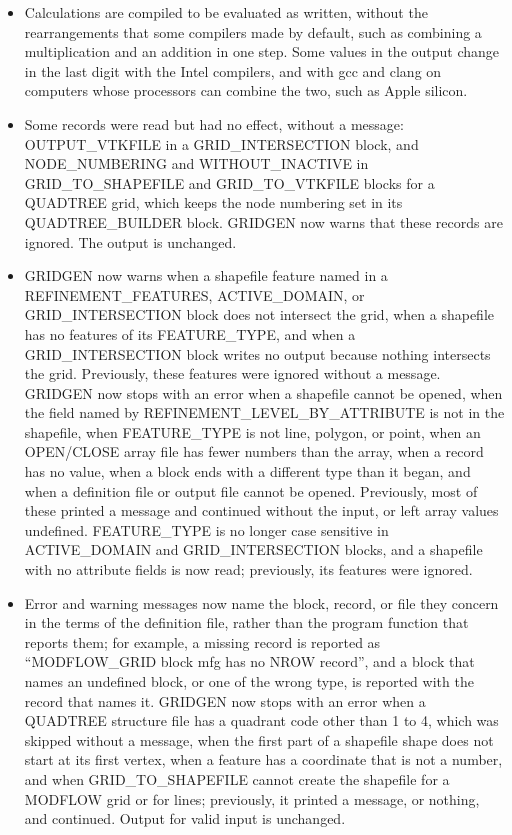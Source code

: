 \begin{itemize}[label=--]
  \item Calculations are compiled to be evaluated as written, without the rearrangements that some compilers made by default, such as combining a multiplication and an addition in one step. Some values in the output change in the last digit with the Intel compilers, and with gcc and clang on computers whose processors can combine the two, such as Apple silicon.
  \item Some records were read but had no effect, without a message: OUTPUT\_VTKFILE in a GRID\_INTERSECTION block, and NODE\_NUMBERING and WITHOUT\_INACTIVE in GRID\_TO\_SHAPEFILE and GRID\_TO\_VTKFILE blocks for a QUADTREE grid, which keeps the node numbering set in its QUADTREE\_BUILDER block. GRIDGEN now warns that these records are ignored. The output is unchanged.
  \item GRIDGEN now warns when a shapefile feature named in a REFINEMENT\_FEATURES, ACTIVE\_DOMAIN, or GRID\_INTERSECTION block does not intersect the grid, when a shapefile has no features of its FEATURE\_TYPE, and when a GRID\_INTERSECTION block writes no output because nothing intersects the grid. Previously, these features were ignored without a message. GRIDGEN now stops with an error when a shapefile cannot be opened, when the field named by REFINEMENT\_LEVEL\_BY\_ATTRIBUTE is not in the shapefile, when FEATURE\_TYPE is not line, polygon, or point, when an OPEN/CLOSE array file has fewer numbers than the array, when a record has no value, when a block ends with a different type than it began, and when a definition file or output file cannot be opened. Previously, most of these printed a message and continued without the input, or left array values undefined. FEATURE\_TYPE is no longer case sensitive in ACTIVE\_DOMAIN and GRID\_INTERSECTION blocks, and a shapefile with no attribute fields is now read; previously, its features were ignored.
  \item Error and warning messages now name the block, record, or file they concern in the terms of the definition file, rather than the program function that reports them; for example, a missing record is reported as ``MODFLOW\_GRID block mfg has no NROW record'', and a block that names an undefined block, or one of the wrong type, is reported with the record that names it. GRIDGEN now stops with an error when a QUADTREE structure file has a quadrant code other than 1 to 4, which was skipped without a message, when the first part of a shapefile shape does not start at its first vertex, when a feature has a coordinate that is not a number, and when GRID\_TO\_SHAPEFILE cannot create the shapefile for a MODFLOW grid or for lines; previously, it printed a message, or nothing, and continued. Output for valid input is unchanged.

\end{itemize}
